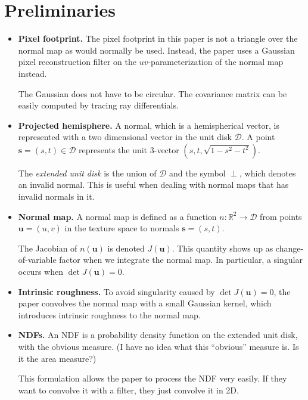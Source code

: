 \documentclass[10pt]{article}
\newcommand{\ve}[1]{\mathbf{#1}}
\newcommand{\ra}{\rightarrow}
\newcommand{\Real}{\mathbb{R}}
\begin{document}
  \section{Preliminaries} %
  \label{sec:preliminaries}
  
  \begin{itemize}
  	\item \textbf{Pixel footprint.} The pixel footprint in this paper is not a triangle over the normal map as would normally be used.  Instead, the paper uses a Gaussian pixel reconstruction filter on the $uv$-parameterization of the normal map instead.

  	The Gaussian does not have to be circular.  The covariance matrix can be easily computed by tracing ray differentials.

  	\item \textbf{Projected hemisphere.}  A normal, which is a hemispherical vector, is represented with a two dimensional vector in the unit disk $\mathcal{D}$.  A point $\ve{s} = (s,t) \in \mathcal{D}$ represents the unit 3-vector $(s,t,\sqrt{1-s^2-t^2})$.

  	The \emph{extended unit disk} is the union of $\mathcal{D}$ and the symbol $\perp$, which denotes an invalid normal.  This is useful when dealing with normal maps that has invalid normals in it.

  	\item \textbf{Normal map.}  A normal map is defined as a function $n: \Real^2 \ra \mathcal{D}$ from points $\ve{u} = (u,v)$ in the texture space to normals $\ve{s} = (s,t)$.

  	The Jacobian of $n(\ve{u})$ is denoted $J(\ve{u})$.  This quantity shows up as change-of-variable factor when we integrate the normal map.  In particular, a singular occurs when $\det J(\ve{u}) = 0$.

  	\item \textbf{Intrinsic roughness.}  To avoid singularity caused by $\det J(\ve{u}) = 0$, the paper convolves the normal map with a small Gaussian kernel, which introduces intrinsic roughness to the normal map.

  	\item \textbf{NDFs.}  An NDF is a probability density function on the extended unit disk, with the obvious measure.  (I have no idea what this ``obvious'' measure is.  Is it the area measure?)

  	This formulation allows the paper to process the NDF very easily.  If they want to convolve it with a filter, they just convolve it in 2D.


\end{itemize}
\end{document}
